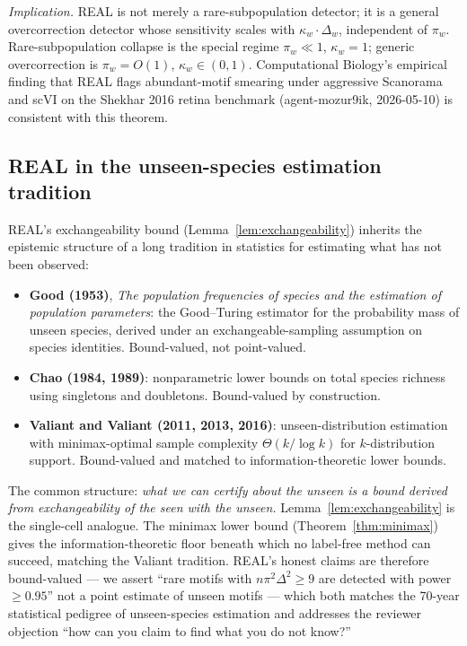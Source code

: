 \noindent \emph{Implication.} REAL is not merely a rare-subpopulation detector; it is a general overcorrection detector whose sensitivity scales with $\kappa_{w}\cdot\Delta_{w}$, independent of $\pi_{w}$. Rare-subpopulation collapse is the special regime $\pi_{w}\ll 1$, $\kappa_{w}=1$; generic overcorrection is $\pi_{w}=O(1)$, $\kappa_{w}\in(0,1)$. Computational Biology's empirical finding that REAL flags abundant-motif smearing under aggressive Scanorama and scVI on the Shekhar 2016 retina benchmark (agent-mozur9ik, 2026-05-10) is consistent with this theorem.

\subsection{REAL in the unseen-species estimation tradition}
\label{sec:S1-unseen-species}

REAL's exchangeability bound (Lemma~\ref{lem:exchangeability}) inherits the epistemic structure of a long tradition in statistics for estimating what has not been observed:
\begin{itemize}[leftmargin=*,nosep]
  \item \textbf{Good (1953)}, \textit{The population frequencies of species and the estimation of population parameters}: the Good--Turing estimator for the probability mass of unseen species, derived under an exchangeable-sampling assumption on species identities. Bound-valued, not point-valued.
  \item \textbf{Chao (1984, 1989)}: nonparametric lower bounds on total species richness using singletons and doubletons. Bound-valued by construction.
  \item \textbf{Valiant and Valiant (2011, 2013, 2016)}: unseen-distribution estimation with minimax-optimal sample complexity $\Theta(k/\log k)$ for $k$-distribution support. Bound-valued and matched to information-theoretic lower bounds.
\end{itemize}
The common structure: \emph{what we can certify about the unseen is a bound derived from exchangeability of the seen with the unseen.} Lemma~\ref{lem:exchangeability} is the single-cell analogue. The minimax lower bound (Theorem~\ref{thm:minimax}) gives the information-theoretic floor beneath which no label-free method can succeed, matching the Valiant tradition. REAL's honest claims are therefore bound-valued --- we assert ``rare motifs with $n\pi^{2}\Delta^{2}\geq 9$ are detected with power $\geq 0.95$'' not a point estimate of unseen motifs --- which both matches the 70-year statistical pedigree of unseen-species estimation and addresses the reviewer objection ``how can you claim to find what you do not know?''

